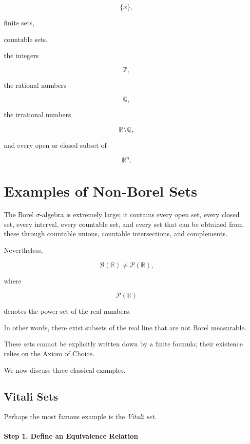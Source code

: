 \documentclass[11pt]{article}
\begin{document}
	\[
	\{x\},
	\]
	
	finite sets,
	
	countable sets,
	
	the integers
	
	\[
	\mathbb Z,
	\]
	
	the rational numbers
	
	\[
	\mathbb Q,
	\]
	
	the irrational numbers
	
	\[
	\mathbb R\setminus\mathbb Q,
	\]
	
	and every open or closed subset of
	
	\[
	\mathbb R^n.
	\]
	
	
	\section{Examples of Non-Borel Sets}
	
	The Borel $\sigma$-algebra is extremely large; it contains every open set,
	every closed set, every interval, every countable set, and every set that can
	be obtained from these through countable unions, countable intersections, and
	complements.
	
	Nevertheless,
	
	\[
	\boxed{
		\mathcal B(\mathbb R)
		\neq
		\mathcal P(\mathbb R),
	}
	\]
	
	where
	
	\[
	\mathcal P(\mathbb R)
	\]
	
	denotes the power set of the real numbers.
	
	In other words, there exist subsets of the real line that are not Borel
	measurable.
	
	These sets cannot be explicitly written down by a finite formula; their
	existence relies on the Axiom of Choice.
	
	We now discuss three classical examples.
	
	
	\subsection{Vitali Sets}
	
	Perhaps the most famous example is the \emph{Vitali set}.
	
	\paragraph{Step 1. Define an Equivalence Relation}
	
\end{document}
